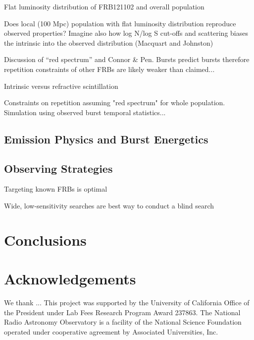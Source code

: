 \documentclass{emulateapj}
\begin{document}
Flat luminosity distribution of FRB121102 and overall population

Does local (100 Mpc) population with flat luminosity distribution reproduce observed properties? Imagine also how log N/log S cut-offs and scattering biases the intrinsic into the observed distribution (Macquart and Johnston)

Discussion of ``red spectrum'' and Connor \& Pen. Bursts predict bursts therefore repetition constraints of other FRBs are likely weaker than claimed...

Intrinsic versus refractive scintillation

Constraints on repetition assuming "red spectrum" for whole population. Simulation using observed burst temporal statistics...


\subsection{Emission Physics and Burst Energetics}



\subsection{Observing Strategies}

Targeting known FRBs is optimal

Wide, low-sensitivity searches are best way to conduct a blind search

\section{Conclusions}





\section*{Acknowledgements}
We thank ...
This project was supported by the University of California Office of the President under Lab Fees Research Program Award 237863. The National Radio Astronomy Observatory is a facility of the National Science Foundation operated under cooperative agreement by Associated Universities, Inc. 



\end{document}
